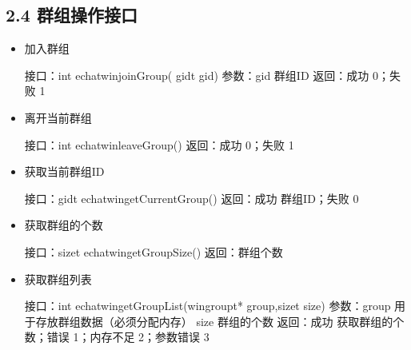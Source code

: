 \documentclass[letterpaper,10pt,english]{sphinxmanual}
\begin{document}
\subsection{2.4 群组操作接口}
\label{\detokenize{c_win:id6}}\begin{itemize}
\item {} 
加入群组

%
\begin{sphinxVerbatim}[commandchars=\\\{\}]
接口：int echat\PYGZus{}win\PYGZus{}joinGroup( gid\PYGZus{}t gid)
参数：gid  群组ID
返回：成功 0；失败 \PYGZhy{}1
\end{sphinxVerbatim}

\item {} 
离开当前群组

%
\begin{sphinxVerbatim}[commandchars=\\\{\}]
接口：int echat\PYGZus{}win\PYGZus{}leaveGroup()
返回：成功 0；失败 \PYGZhy{}1
\end{sphinxVerbatim}

\item {} 
获取当前群组ID

%
\begin{sphinxVerbatim}[commandchars=\\\{\}]
接口：gid\PYGZus{}t echat\PYGZus{}win\PYGZus{}getCurrentGroup()
返回：成功 群组ID；失败 0
\end{sphinxVerbatim}

\item {} 
获取群组的个数

%
\begin{sphinxVerbatim}[commandchars=\\\{\}]
接口：size\PYGZus{}t echat\PYGZus{}win\PYGZus{}getGroupSize()
返回：群组个数
\end{sphinxVerbatim}

\item {} 
获取群组列表

%
\begin{sphinxVerbatim}[commandchars=\\\{\}]
接口：int  echat\PYGZus{}win\PYGZus{}getGroupList(win\PYGZus{}group\PYGZus{}t* group,size\PYGZus{}t size)
参数：group  用于存放群组数据（必须分配内存）
  size  群组的个数
返回：成功  获取群组的个数；错误  \PYGZhy{}1；内存不足  \PYGZhy{}2；参数错误  \PYGZhy{}3
\end{sphinxVerbatim}


\end{itemize}
\end{document}
